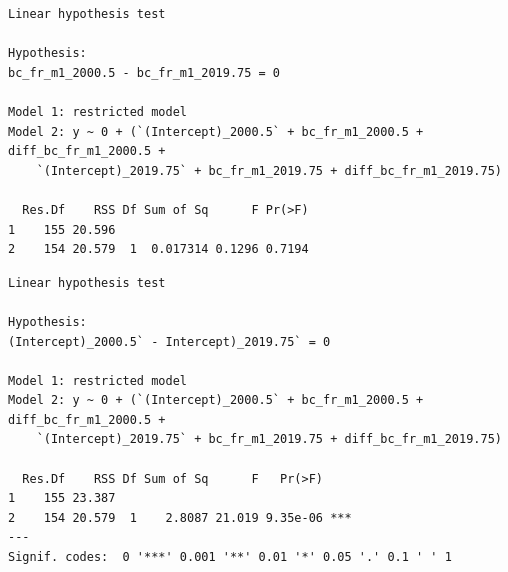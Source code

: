 \documentclass[
  a4paper,
  DIV=11,
  numbers=noendperiod,
  french]{scrartcl}
\newenvironment{Shaded}{\begin{snugshade}}{\end{snugshade}}
\newcommand{\AttributeTok}[1]{\textcolor[rgb]{0.40,0.45,0.13}{#1}}
\newcommand{\CommentTok}[1]{\textcolor[rgb]{0.37,0.37,0.37}{#1}}
\newcommand{\FunctionTok}[1]{\textcolor[rgb]{0.28,0.35,0.67}{#1}}
\newcommand{\NormalTok}[1]{\textcolor[rgb]{0.00,0.23,0.31}{#1}}
\newcommand{\SpecialCharTok}[1]{\textcolor[rgb]{0.37,0.37,0.37}{#1}}
\newcommand{\StringTok}[1]{\textcolor[rgb]{0.13,0.47,0.30}{#1}}
\newcommand\1{{\mathds 1}}
\theoremstyle{remark}
\begin{document}
\begin{verbatim}
Linear hypothesis test

Hypothesis:
bc_fr_m1_2000.5 - bc_fr_m1_2019.75 = 0

Model 1: restricted model
Model 2: y ~ 0 + (`(Intercept)_2000.5` + bc_fr_m1_2000.5 + diff_bc_fr_m1_2000.5 + 
    `(Intercept)_2019.75` + bc_fr_m1_2019.75 + diff_bc_fr_m1_2019.75)

  Res.Df    RSS Df Sum of Sq      F Pr(>F)
1    155 20.596                           
2    154 20.579  1  0.017314 0.1296 0.7194
\end{verbatim}

\begin{Shaded}
\end{Shaded}

\begin{verbatim}
Linear hypothesis test

Hypothesis:
(Intercept)_2000.5` - Intercept)_2019.75` = 0

Model 1: restricted model
Model 2: y ~ 0 + (`(Intercept)_2000.5` + bc_fr_m1_2000.5 + diff_bc_fr_m1_2000.5 + 
    `(Intercept)_2019.75` + bc_fr_m1_2019.75 + diff_bc_fr_m1_2019.75)

  Res.Df    RSS Df Sum of Sq      F   Pr(>F)    
1    155 23.387                                 
2    154 20.579  1    2.8087 21.019 9.35e-06 ***
---
Signif. codes:  0 '***' 0.001 '**' 0.01 '*' 0.05 '.' 0.1 ' ' 1
\end{verbatim}

\begin{Shaded}
\end{Shaded}
\end{document}
